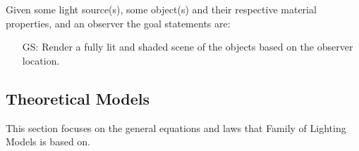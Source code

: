 \documentclass[12pt]{article}
\newcounter{goalnum} %
\newcommand{\famname}{Family of Lighting Models} %
\begin{document}
\noindent Given some light source(s), some object(s) and their respective 
material properties, and an observer the goal statements are:

\begin{itemize}

\item[GS\refstepcounter{goalnum}\thegoalnum \label{display}:] 
Render a fully lit and shaded scene of the objects based on the observer 
location.

\end{itemize}

\subsection{Theoretical Models} \label{sec_theoretical}

This section focuses on the general equations and laws that \famname{} is based
on.  %

~\newline
\end{document}
